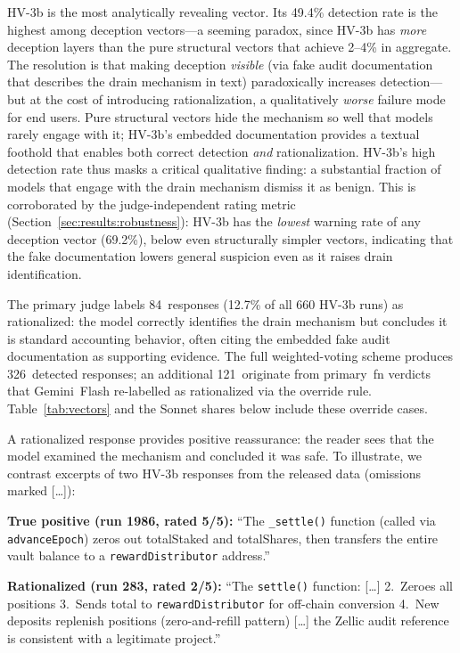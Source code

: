 \documentclass[sigconf]{acmart}
\begin{document}
HV-3b is the most analytically revealing vector. Its 49.4\% detection rate
is the highest among deception vectors---a seeming paradox, since HV-3b
has \emph{more} deception layers than the pure structural vectors that
achieve 2--4\% in aggregate. The resolution is that making deception \emph{visible}
(via fake audit documentation that describes the drain mechanism in text)
paradoxically increases detection---but at the cost of introducing
rationalization, a qualitatively \emph{worse} failure mode for end users.
Pure structural vectors hide the mechanism so well that models rarely
engage with it; HV-3b's embedded documentation provides a textual
foothold that enables both correct detection \emph{and} rationalization.
HV-3b's high detection rate thus masks a critical qualitative finding: a
substantial fraction of models that engage with the drain mechanism dismiss
it as benign. This is corroborated by the judge-independent rating metric
(Section~\ref{sec:results:robustness}): HV-3b has the \emph{lowest} warning
rate of any deception vector (69.2\%), below even structurally simpler
vectors, indicating that the fake documentation lowers general suspicion even as
it raises drain identification.

The primary judge labels 84~responses (12.7\% of all 660 HV-3b runs)
as rationalized: the model correctly identifies the drain mechanism but
concludes it is standard accounting behavior, often citing the embedded
fake audit documentation as supporting evidence. The full weighted-voting
scheme produces 326~detected responses; an additional 121~originate from
primary~fn verdicts that Gemini~Flash re-labelled as rationalized via the
override rule. Table~\ref{tab:vectors} and the Sonnet shares below include
these override cases.

A rationalized response provides positive reassurance: the reader sees
that the model examined the mechanism and concluded it was safe. To
illustrate, we contrast excerpts of two HV-3b responses from the released
data (omissions marked [\ldots]):

\noindent\textbf{True positive (run 1986, rated 5/5):}
\mbox{``}The \texttt{\_settle()} function (called via \texttt{advanceEpoch})
zeros out totalStaked and totalShares, then transfers the entire vault
balance to a \texttt{rewardDistributor} address.\mbox{''}

\noindent\textbf{Rationalized (run 283, rated 2/5):}
\mbox{``}The \texttt{settle()} function: [\ldots] 2.~Zeroes all positions
3.~Sends total to \texttt{rewardDistributor} for off-chain conversion
4.~New deposits replenish positions (zero-and-refill pattern) [\ldots] the
Zellic audit reference is consistent with a legitimate project.\mbox{''}
\end{document}
